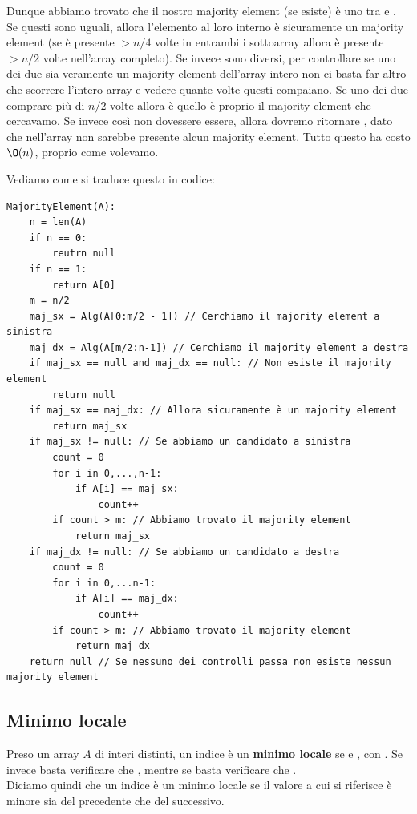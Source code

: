 \documentclass[11pt, a4paper, titlepage, oneside]{scrbook}
\begin{document}
Dunque abbiamo trovato che il nostro majority element (se esiste) è uno tra  e . Se questi sono uguali, allora l'elemento al loro interno è sicuramente un majority element (se è presente $> n/4$ volte in entrambi i sottoarray allora è presente $>n/2$ volte nell'array completo). Se invece sono diversi, per controllare se uno dei due sia veramente un majority element dell'array intero non ci basta far altro che scorrere l'intero array e vedere quante volte questi compaiano. Se uno dei due comprare più di $n/2$ volte allora è quello è proprio il majority element che cercavamo. Se invece così non dovessere essere, allora dovremo ritornare , dato che nell'array non sarebbe presente alcun majority element. Tutto questo ha costo $\O(n)$, proprio come volevamo.

Vediamo come si traduce questo in codice:
\begin{lstlisting}
MajorityElement(A):
    n = len(A)
    if n == 0:
        reutrn null
    if n == 1:
        return A[0]
    m = n/2
    maj_sx = Alg(A[0:m/2 - 1]) // Cerchiamo il majority element a sinistra
    maj_dx = Alg(A[m/2:n-1]) // Cerchiamo il majority element a destra
    if maj_sx == null and maj_dx == null: // Non esiste il majority element
        return null
    if maj_sx == maj_dx: // Allora sicuramente è un majority element
        return maj_sx
    if maj_sx != null: // Se abbiamo un candidato a sinistra
        count = 0
        for i in 0,...,n-1:
            if A[i] == maj_sx:
                count++
        if count > m: // Abbiamo trovato il majority element
            return maj_sx
    if maj_dx != null: // Se abbiamo un candidato a destra
        count = 0
        for i in 0,...n-1:
            if A[i] == maj_dx:
                count++
        if count > m: // Abbiamo trovato il majority element
            return maj_dx
    return null // Se nessuno dei controlli passa non esiste nessun majority element
\end{lstlisting}

\subsection{Minimo locale}

\begin{Definizione}
\label{def-minimo-lcoale}
Preso un array $A$ di interi distinti, un indice  è un \textbf{minimo locale} se  e , con . Se invece  basta verificare che , mentre se  basta verificare che . \\
Diciamo quindi che un indice è un minimo locale se il valore a cui si riferisce è minore sia del precedente che del successivo.
\end{Definizione}
\end{document}
